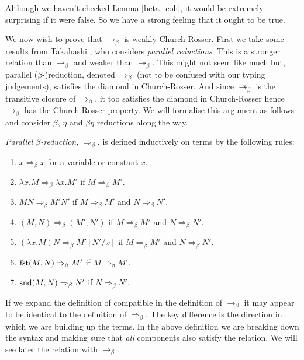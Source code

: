 \begin{remark}
    Although we haven't checked Lemma \ref{beta_coh}, it would be extremely surprising if it were false. So we have a strong feeling that it ought to be true. 
\end{remark}

We now wish to prove that $\to_\beta$ is weakly Church-Rosser. First we take some results from Takahashi \cite{TakahashiM1989PRIL, Takahashi:1995:PR9:207177.207191}, who considers \emph{parallel reductions}. This is a stronger relation than $\to_{\beta}$ and weaker than $\twoheadrightarrow_{\beta}$. This might not seem like much but, parallel ($\beta$-)reduction, denoted $\Rightarrow_{\beta}$ (not to be confused with our typing judgements), satisfies the diamond in Church-Rosser. And since $\twoheadrightarrow_{\beta}$ is the transitive closure of $\Rightarrow_{\beta}$, it too satisfies the diamond in Church-Rosser hence $\to_{\beta}$ has the Church-Rosser property. We will formalise this argument as follows and consider $\beta$, $\eta$ and $\beta \eta$ reductions along the way.

\begin{defin}
    \emph{Parallel $\beta$-reduction}, $\Rightarrow_{\beta}$, is defined inductively on terms by the following rules:
    \begin{enumerate}
        \item $x \Rightarrow_{\beta} x$ for a variable or constant $x$.
        \item $\lambda x . M \Rightarrow_{\beta} \lambda x . M'$ if $M \Rightarrow_{\beta} M'$.
        \item $MN \Rightarrow_{\beta} M' N'$ if $M \Rightarrow_{\beta} M'$ and $N \Rightarrow_{\beta} N'$.
        \item $(M, N) \Rightarrow_{\beta} (M', N')$ if $M \Rightarrow_{\beta} M'$ and $N \Rightarrow_{\beta} N'$.
        \item $(\lambda x . M)N \Rightarrow_{\beta} M'[N' / x]$ if $M \Rightarrow_{\beta} M'$ and $N \Rightarrow_{\beta} N'$.
        \item $\mathrm{fst}(M, N) \Rightarrow_{\beta} M'$ if $M \Rightarrow_{\beta} M'$.
        \item $\mathrm{snd}(M, N) \Rightarrow_{\beta} N'$ if $N \Rightarrow_{\beta} N'$.
    \end{enumerate}
\end{defin}

\begin{remark}
    If we expand the definition of compatible in the definition of $\to_{\beta}$ it may appear to be identical to the definition of $\Rightarrow_{\beta}$. The key difference is the direction in which we are building up the terms. In the above definition we are breaking down the syntax and making sure that \emph{all} components also satisfy the relation. We will see later the relation with $\to_{\beta}$.
\end{remark}


